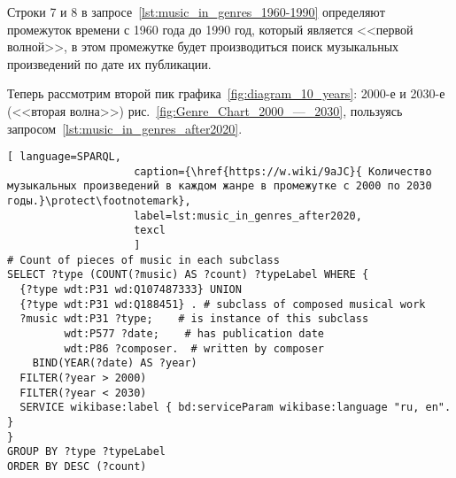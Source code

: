 Строки 7 и 8 в запросе~\ref{lst:music_in_genres_1960-1990} определяют промежуток времени с 1960 года до 1990 год, который является <<первой волной>>, в этом промежутке будет производиться поиск музыкальных произведений по дате их публикации.





\newpage
Теперь рассмотрим второй пик графика~\ref{fig:diagram_10_years}: 2000-е и 2030-е (<<вторая волна>>) рис.~\ref{fig:Genre_Chart_2000_—_2030}, пользуясь запросом~\ref{lst:music_in_genres_after2020}.

\begin{lstlisting}[ language=SPARQL,
                    caption={\href{https://w.wiki/9aJC}{ Количество музыкальных произведений в каждом жанре в промежутке с 2000 по 2030 годы.}\protect\footnotemark},
                    label=lst:music_in_genres_after2020,
                    texcl 
                    ]
# Count of pieces of music in each subclass
SELECT ?type (COUNT(?music) AS ?count) ?typeLabel WHERE {
  {?type wdt:P31 wd:Q107487333} UNION 
  {?type wdt:P31 wd:Q188451} . # subclass of composed musical work
  ?music wdt:P31 ?type;    # is instance of this subclass
         wdt:P577 ?date;    # has publication date
         wdt:P86 ?composer.  # written by composer
    BIND(YEAR(?date) AS ?year)
  FILTER(?year > 2000)        
  FILTER(?year < 2030)
  SERVICE wikibase:label { bd:serviceParam wikibase:language "ru, en". }
}
GROUP BY ?type ?typeLabel
ORDER BY DESC (?count)
\end{lstlisting}%

